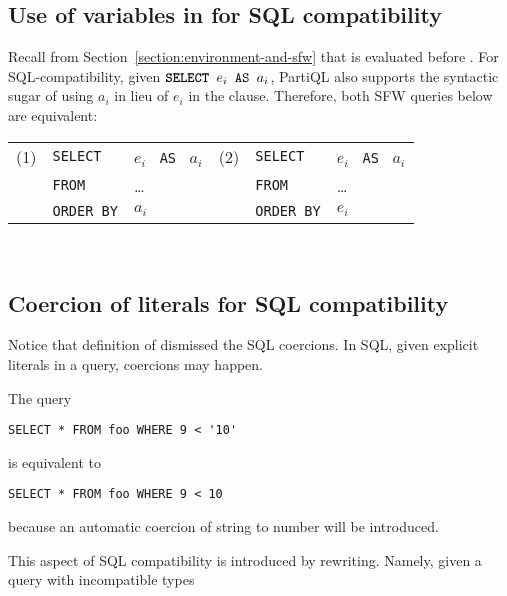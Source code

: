 \subsection{Use of  variables in  for SQL compatibility}
\label{sec:select-variables-in-order}
Recall from Section~\ref{section:environment-and-sfw} that  is
evaluated before . For SQL-compatibility, given $\texttt{\textbf{SELECT }} e_i
\texttt{ AS } a_i$, PartiQL also supports the syntactic sugar of using $a_i$ in
lieu of $e_i$ in the  clause. Therefore, both SFW queries below are
equivalent: ~\\
\begin{tabular}{@{}l@{~}l@{~}l@{~}l@{~}l@{~}l@{}}
(1) & \texttt{SELECT}   & $e_i$ \texttt{ AS } $a_i$   & (2)   & \texttt{SELECT}
& $e_i$ \texttt{ AS } $a_i$   \\
    & \texttt{FROM}     & \ldots                      &       & \texttt{FROM}
    & \ldots                      \\
    & \texttt{ORDER BY} & $a_i$                       &       & \texttt{ORDER
    BY} & $e_i$                       \\
\end{tabular} \\

\subsection{Coercion of literals for SQL compatibility}
\label{sec:literal-conversion}

Notice that definition of \gl{<} dismissed the SQL coercions. In SQL, given
explicit literals in a query, coercions may happen.

\begin{example}
The query
\begin{verbatim} 
SELECT * FROM foo WHERE 9 < '10'
\end{verbatim}
is equivalent to
\begin{verbatim} 
SELECT * FROM foo WHERE 9 < 10
\end{verbatim}
because an automatic coercion of string to number will be introduced. 
\end{example}

This aspect of SQL compatibility is introduced by rewriting. Namely, given a
query with incompatible types 
